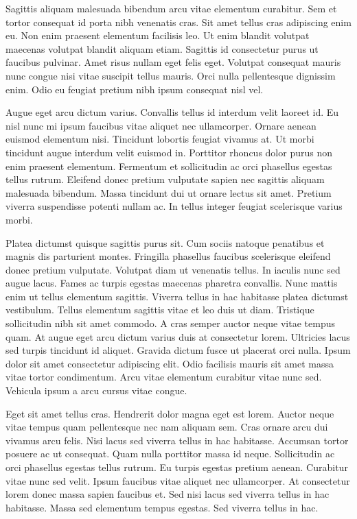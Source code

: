 \documentclass[11pt,a4paper]{article}
\begin{document}
Sagittis aliquam malesuada bibendum arcu vitae elementum curabitur. Sem et tortor consequat id porta nibh venenatis cras. Sit amet tellus cras adipiscing enim eu. Non enim praesent elementum facilisis leo. Ut enim blandit volutpat maecenas volutpat blandit aliquam etiam. Sagittis id consectetur purus ut faucibus pulvinar. Amet risus nullam eget felis eget. Volutpat consequat mauris nunc congue nisi vitae suscipit tellus mauris. Orci nulla pellentesque dignissim enim. Odio eu feugiat pretium nibh ipsum consequat nisl vel.

Augue eget arcu dictum varius. Convallis tellus id interdum velit laoreet id. Eu nisl nunc mi ipsum faucibus vitae aliquet nec ullamcorper. Ornare aenean euismod elementum nisi. Tincidunt lobortis feugiat vivamus at. Ut morbi tincidunt augue interdum velit euismod in. Porttitor rhoncus dolor purus non enim praesent elementum. Fermentum et sollicitudin ac orci phasellus egestas tellus rutrum. Eleifend donec pretium vulputate sapien nec sagittis aliquam malesuada bibendum. Massa tincidunt dui ut ornare lectus sit amet. Pretium viverra suspendisse potenti nullam ac. In tellus integer feugiat scelerisque varius morbi.

Platea dictumst quisque sagittis purus sit. Cum sociis natoque penatibus et magnis dis parturient montes. Fringilla phasellus faucibus scelerisque eleifend donec pretium vulputate. Volutpat diam ut venenatis tellus. In iaculis nunc sed augue lacus. Fames ac turpis egestas maecenas pharetra convallis. Nunc mattis enim ut tellus elementum sagittis. Viverra tellus in hac habitasse platea dictumst vestibulum. Tellus elementum sagittis vitae et leo duis ut diam. Tristique sollicitudin nibh sit amet commodo. A cras semper auctor neque vitae tempus quam. At augue eget arcu dictum varius duis at consectetur lorem. Ultricies lacus sed turpis tincidunt id aliquet. Gravida dictum fusce ut placerat orci nulla. Ipsum dolor sit amet consectetur adipiscing elit. Odio facilisis mauris sit amet massa vitae tortor condimentum. Arcu vitae elementum curabitur vitae nunc sed. Vehicula ipsum a arcu cursus vitae congue.

Eget sit amet tellus cras. Hendrerit dolor magna eget est lorem. Auctor neque vitae tempus quam pellentesque nec nam aliquam sem. Cras ornare arcu dui vivamus arcu felis. Nisi lacus sed viverra tellus in hac habitasse. Accumsan tortor posuere ac ut consequat. Quam nulla porttitor massa id neque. Sollicitudin ac orci phasellus egestas tellus rutrum. Eu turpis egestas pretium aenean. Curabitur vitae nunc sed velit. Ipsum faucibus vitae aliquet nec ullamcorper. At consectetur lorem donec massa sapien faucibus et. Sed nisi lacus sed viverra tellus in hac habitasse. Massa sed elementum tempus egestas. Sed viverra tellus in hac.
\end{document}
